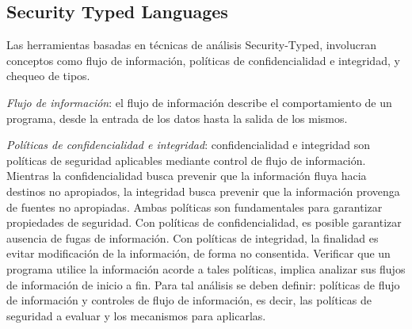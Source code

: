 \subsection{Security Typed Languages}
Las herramientas basadas en técnicas de análisis Security-Typed, involucran
conceptos como flujo de información, políticas de confidencialidad e integridad,
y chequeo de tipos.

\emph{Flujo de información}: el flujo de información describe el
comportamiento de un programa, desde la entrada de los datos hasta la salida de
los mismos. 

\emph{Políticas de confidencialidad e integridad}: confidencialidad e integridad
son políticas de seguridad aplicables mediante control de flujo de información.
Mientras la confidencialidad busca prevenir que la información fluya hacia
destinos no apropiados, la integridad busca prevenir que la información provenga
de fuentes no apropiadas\cite{LanguageIFS-2013}.\newline
Ambas políticas son fundamentales para garantizar propiedades de
seguridad.\newline 
Con políticas de confidencialidad, es posible garantizar ausencia de fugas de
información. Con políticas de integridad, la finalidad es evitar
modificación de la información, de forma no consentida.\newline 
Verificar que un programa utilice la información acorde a
tales políticas, implica analizar sus flujos de información de inicio a fin.
Para tal análisis se deben definir: políticas de flujo de información y
controles de flujo de información, es decir, las políticas de seguridad a
evaluar y los mecanismos para aplicarlas. 

